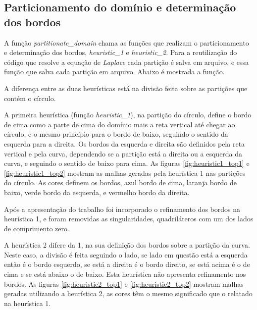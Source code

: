 \documentclass[a4paper]{article}
\begin{document}
\subsection{Particionamento do domínio e determinação dos bordos}

A função \textit{partitionate\_domain} chama as funções que realizam o particionamento e determinação dos bordos, \textit{heuristic\_1} e \textit{heuristic\_2}. Para a reutilização do código que resolve a equação de \textit{Laplace} cada partição é salva em arquivo, e essa função que salva cada partição em arquivo.
Abaixo é mostrada a função.


A diferença entre as duas heurísticas está na divisão feita sobre as partições que contém o círculo.

A primeira heurística (função \textit{heuristic\_1}), na partição do círculo, define o bordo de cima como a parte de cima do domínio mais a reta vertical até chegar ao círculo, e o mesmo princípio para o bordo de baixo, seguindo o sentido da esquerda para a direita. Os bordos da esquerda e direita são definidos pela reta vertical e pela curva, dependendo se a partição está a direita ou a esquerda da curva, e seguindo o sentido de baixo para cima.
As figuras \ref{fig:heuristic1_top1} e \ref{fig:heuristic1_top2} mostram as malhas geradas pela heurística 1 nas partições do círculo. As cores definem os bordos, azul bordo de cima, laranja bordo de baixo, verde bordo da esquerda, e vermelho bordo da direita.

Após a apresentação do trabalho foi incorporado o refinamento dos bordos na heurística 1, e foram removidas as singularidades, quadriláteros com um dos lados de comprimento zero.








A heurística 2 difere da 1, na sua definição dos bordos sobre a partição da curva. Neste caso, a divisão é feita seguindo o lado, se lado em questão está a esquerda então é o bordo esquerdo, se está a direita é o bordo direito, se está acima é o de cima e se está abaixo o de baixo. Esta heurística não apresenta refinamento nos bordos.
As figuras \ref{fig:heuristic2_top1} e \ref{fig:heuristic2_top2} mostram malhas geradas utilizando a heurística 2, as cores têm o mesmo significado que o relatado na heurística 1.
\end{document}
